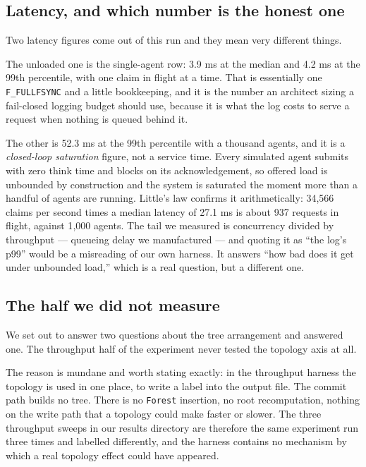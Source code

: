 \documentclass[11pt]{article}
\begin{document}
\subsection{Latency, and which number is the honest one}

Two latency figures come out of this run and they mean very different things.

The unloaded one is the single-agent row: 3.9 ms at the median
and 4.2 ms at the 99th percentile, with one claim in flight at
a time. That is essentially one \texttt{F\_FULLFSYNC} and a little bookkeeping,
and it is the number an architect sizing a fail-closed logging budget should
use, because it is what the log costs to serve a request when nothing is queued
behind it.

The other is 52.3 ms at the 99th percentile with a thousand
agents, and it is a \emph{closed-loop saturation} figure, not a service time.
Every simulated agent submits with zero think time and blocks on its
acknowledgement, so offered load is unbounded by construction and the system is
saturated the moment more than a handful of agents are running. Little's law
confirms it arithmetically: 34,566 claims per second times a median
latency of 27.1 ms is about 937 requests in flight, against
1{,}000 agents. The tail we measured is concurrency divided by throughput ---
queueing delay we manufactured --- and quoting it as ``the log's p99'' would be
a misreading of our own harness. It answers ``how bad does it get under
unbounded load,'' which is a real question, but a different one.

\subsection{The half we did not measure}

We set out to answer two questions about the tree arrangement and answered
one. The throughput half of the experiment never tested the topology axis at
all.

The reason is mundane and worth stating exactly: in the throughput harness the
topology is used in one place, to write a label into the output file. The
commit path builds no tree. There is no \texttt{Forest} insertion, no root
recomputation, nothing on the write path that a topology could make faster or
slower. The three throughput sweeps in our results directory are therefore the
same experiment run three times and labelled differently, and the harness
contains no mechanism by which a real topology effect could have appeared.
\end{document}
